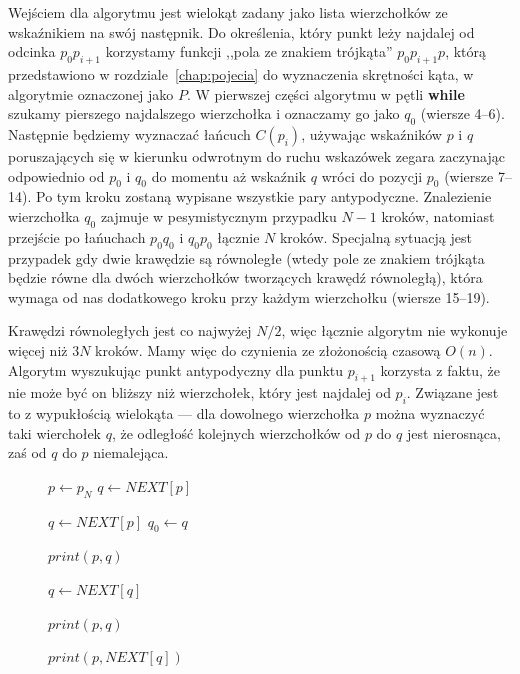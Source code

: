Wejściem dla algorytmu jest wielokąt zadany jako lista wierzchołków ze
wskaźnikiem na swój następnik. Do określenia, który punkt leży
najdalej od odcinka $p_{0}p_{i+1}$ korzystamy funkcji ,,pola ze
znakiem trójkąta'' $p_{0}p_{i+1}p$, którą przedstawiono w
rozdziale~\ref{chap:pojecia} do wyznaczenia skrętności kąta, w
algorytmie oznaczonej jako $P$. W pierwszej części algorytmu w pętli
\textbf{while} szukamy pierszego najdalszego wierzchołka i oznaczamy
go jako $q_0$ (wiersze 4--6). Następnie będziemy wyznaczać łańcuch
$C(p_i)$, używając wskaźników $p$ i $q$ poruszających się w kierunku
odwrotnym do ruchu wskazówek zegara zaczynając odpowiednio od $p_0$ i
$q_0$ do momentu aż wskaźnik $q$ wróci do pozycji $p_0$ (wiersze
7--14). Po tym kroku zostaną wypisane wszystkie pary
antypodyczne. Znalezienie wierzchołka $q_0$ zajmuje w pesymistycznym
przypadku $N-1$ kroków, natomiast przejście po łańuchach $p_{0}q_{0}$
i $q_{0}p_{0}$ łącznie $N$ kroków. Specjalną sytuacją jest przypadek
gdy dwie krawędzie są równoległe (wtedy pole ze znakiem trójkąta
będzie równe dla dwóch wierzchołków tworzących krawędź równoległą),
która wymaga od nas dodatkowego kroku przy każdym wierzchołku (wiersze
15--19).

Krawędzi równoległych jest co najwyżej $N/2$, więc łącznie
algorytm nie wykonuje więcej niż $3N$ kroków. Mamy więc do czynienia
ze złożonością czasową $O(n)$.
Algorytm wyszukując punkt antypodyczny dla punktu $p_{i+1}$ korzysta z
faktu, że nie może być on bliższy niż wierzchołek, który jest najdalej
od $p_i$. Związane jest to z wypukłością wielokąta --- dla dowolnego
wierzchołka $p$ można wyznaczyć taki wierchołek $q$, że odległość
kolejnych wierzchołków od $p$ do $q$ jest nierosnąca, zaś od $q$ do
$p$ niemalejąca.

\begin{figure}[htp]
\label{alg:antipodal}
\begin{algorithmic}[1]

\State $p \gets p_N$
\State $q \gets NEXT[p]$

    \State $q \gets NEXT[p]$
    \State $q_0 \gets q$

        \State $print (p, q)$

            \State $q \gets NEXT[q]$

                \State $print (p, q)$
            \EndIf
        \EndWhile

                \State $print (p, NEXT[q])$
            \EndIf
        \EndIf
    \EndWhile
\EndWhile
\EndProcedure

\end{algorithmic}
\end{figure}

